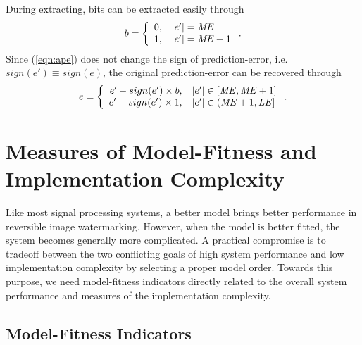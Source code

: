 \documentclass[journal]{IEEEtran}
\begin{document}
During extracting, bits can be extracted easily through
\begin{equation}\label{eqn:addextract}
  b = \left\{ \begin{array}{r@{,\quad}l}
  0 & |e'| = \mathit{ME} \\
  1 & |e'| = \mathit{ME} + 1 \\
\end{array} \right. .
\end{equation}
Since (\ref{eqn:ape}) does not change the sign of prediction-error, i.e.\ $sign(e') \equiv sign(e)$,
the original prediction-error can be recovered through
\begin{equation}\label{eqn:addrecover}
 e = \left\{ \begin{array}{r@{,\quad}l}
  e' - sign(e') \times b & |e'| \in [\mathit{ME}, \mathit{ME}+1] \\
  e' - sign(e') \times 1 & |e'| \in (\mathit{ME}+1, \mathit{LE}] \\
\end{array} \right. .
\end{equation}

\section{Measures of Model-Fitness and Implementation Complexity}\label{sec:indicator}

Like most signal processing systems, a better model brings better performance in reversible image
watermarking. However, when the model is better fitted, the system becomes generally more
complicated. A practical compromise is to tradeoff between the two conflicting goals of high system
performance and low implementation complexity by selecting a proper model order. Towards this
purpose, we need model-fitness indicators directly related to the overall system performance and
measures of the implementation complexity. 

\subsection{Model-Fitness Indicators}
\end{document}
